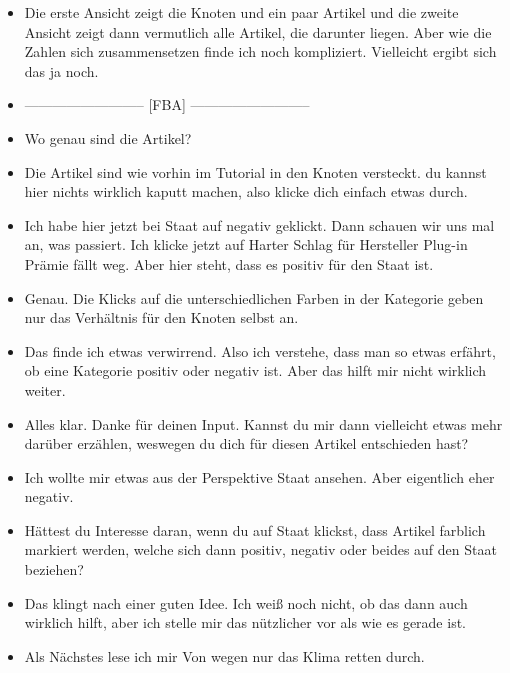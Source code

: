 {\begin{itemize}[]
        \item {} Die erste Ansicht zeigt die Knoten und ein paar Artikel und die zweite Ansicht zeigt dann vermutlich alle Artikel, die darunter liegen.
              Aber wie die Zahlen sich zusammensetzen finde ich noch kompliziert.
              Vielleicht ergibt sich das ja noch.
        \item {--------------------------} [FBA] {--------------------------}
        \item {} Wo genau sind die Artikel?
        \item {} Die Artikel sind wie vorhin im Tutorial in den Knoten versteckt.
              du kannst hier nichts wirklich kaputt machen, also klicke dich einfach etwas durch.
        \item {} Ich habe hier jetzt bei Staat auf negativ geklickt.
              Dann schauen wir uns mal an, was passiert.
              Ich klicke jetzt auf \flqq Harter Schlag für Hersteller Plug-in Prämie fällt weg\frqq{}.
              Aber hier steht, dass es positiv für den Staat ist.
        \item {} Genau.
              Die Klicks auf die unterschiedlichen Farben in der Kategorie geben nur das Verhältnis für den Knoten selbst an.
        \item {} Das finde ich etwas verwirrend.
              Also ich verstehe, dass man so etwas erfährt, ob eine Kategorie positiv oder negativ ist.
              Aber das hilft mir nicht wirklich weiter.
        \item {} Alles klar.
              Danke für deinen Input.
              Kannst du mir dann vielleicht etwas mehr darüber erzählen, weswegen du dich für diesen Artikel entschieden hast?
        \item {} Ich wollte mir etwas aus der Perspektive Staat ansehen. Aber eigentlich eher negativ.
        \item {} Hättest du Interesse daran, wenn du auf Staat klickst, dass Artikel farblich markiert werden, welche sich dann positiv, negativ oder beides auf den Staat beziehen?
        \item {} Das klingt nach einer guten Idee.
              Ich weiß noch nicht, ob das dann auch wirklich hilft, aber ich stelle mir das nützlicher vor als wie es gerade ist.
        \item {} Als Nächstes lese ich mir \flqq Von wegen nur das Klima retten\frqq{} durch.

\end{itemize}}
